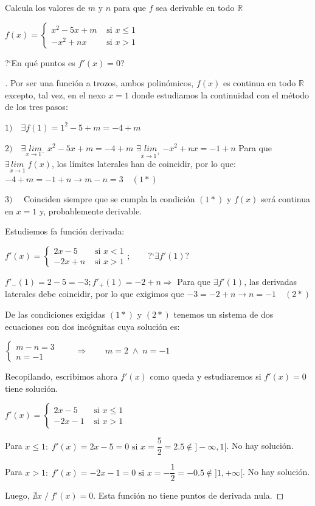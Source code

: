 	\begin{ejre} 	Calcula los valores de $m$ y $n$ para que $f$ sea derivable en todo $\mathbb R$ 
	
		$f(x)=
		\begin{cases}
		x^2-5x+m & \mbox{ si } x\le 1 \\
		-x^2+nx & \mbox{ si } x >1  
		\end{cases} $
		
		?`En qué puntos es $f'(x)=0$?
	\end{ejre}
	
	\begin{proof}[]
	\renewcommand{\qedsymbol}{$\diamond$}
	
	Por ser una función a trozos, ambos polinómicos, $f(x)$ es continua en todo $\mathbb R$ excepto, tal vez, en el nexo $x=1$ donde estudiamos la continuidad con el método de los tres pasos:
	
	$1) \quad \exists f(1)=1^2-5+m=-4+m$
	
	$2) \quad \exists \underset{x\to 1^-}{lim}\;{x^2-5x+m}=-4+m$
	$ \exists \underset{x\to 1^+}{lim}\;{-x^2+nx}=-1+n$
	Para que $\exists \underset{x\to 1}{lim}\;{f(x)}$, los límites laterales han de coincidir, por lo que: $-4+m=-1+n \to m-n=3 \quad (1*)$
	
	$3) \quad$ Coinciden siempre que se cumpla la condición $(1*)$ y $f(x)$ será continua en $x=1$ y, probablemente derivable.
	
	Estudiemos fa función derivada:
	
	$f'(x)=
		\begin{cases}
		2x-5 & \mbox{ si } x< 1 \\
		-2x+n & \mbox{ si } x >1  
		\end{cases} ; \qquad \mbox{?`} \exists f'(1)?$
		
	$f'_-(1)=2-5=-3; f'_+(1)=-2+n \Rightarrow $ Para que $\exists f'(1)$, las derivadas laterales debe coincidir, por lo que exigimos que $-3=-2+n \to n=-1 \quad (2*)$
	
	De las condiciones exigidas $(1*)$ y $(2*)$ tenemos un sistema de dos ecuaciones con dos incógnitas cuya solución es:
	
	$\begin{cases}
		m-n=3 \\
		n=-1
	\end{cases}  \qquad \Rightarrow \qquad m=2 \; \wedge \; n=-1$
	
	Recopilando, escribimos ahora $f'(x)$ como queda y estudiaremos si $f'(x)=0$ tiene solución.
	
	$f'(x)=
		\begin{cases}
		2x-5 & \mbox{ si } x\le 1 \\
		-2x-1 & \mbox{ si } x >1  
		\end{cases}$
	
	Para $x\le 1 :\; f'(x)=2x-5=0 \mbox{ si } x=\dfrac 5 2 = 2.5 \notin ]-\infty,1[ $. No hay solución.
	
	Para $x> 1 : \; f'(x)=-2x-1=0 \mbox{ si } x=-\dfrac 1 2 = -0.5 \notin ]1,+\infty[ $. No hay solución.
	
	Luego, $\nexists x \; / \; f'(x)=0$. Esta función no tiene puntos de derivada nula.
	\end{proof}
	
